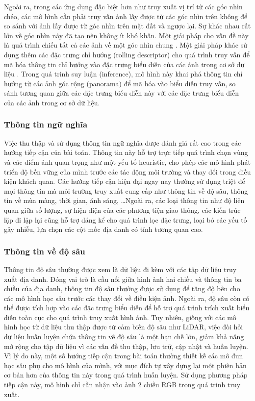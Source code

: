 Ngoài ra, trong các ứng dụng đặc biệt hơn như truy xuất vị trí từ các góc nhìn chéo, các mô hình cần phải truy vấn ảnh lấy được từ các góc nhìn trên không để so sánh với ảnh lấy được từ góc nhìn trên mặt đất và ngược lại. Sự khác nhau rất lớn về góc nhìn này đã tạo nên không ít khó khăn. Một giải pháp cho vấn đề này là quá trình chiếu tất cả các ảnh về một góc nhìn chung \cite{lin2015learning, castaldo2015semantic}. Một giải pháp khác sử dụng thêm các đặc trưng chỉ hướng (rolling descriptor) cho quá trình truy vấn để mã hóa thông tin chỉ hướng vào đặc trưng biểu diễn của các ảnh trong cơ sở dữ liệu \cite{xia2023convolutional}. Trong quá trình suy luận (inference), mô hình này khai phá thông tin chỉ hướng từ các ảnh góc rộng (panorama) để mã hóa vào biểu diễn truy vấn, so sánh tương quan giữa các đặc trưng biểu diễn này với các đặc trưng biểu diễn của các ảnh trong cơ sở dữ liệu.

\subsubsection{Thông tin ngữ nghĩa}

Việc thu thập và sử dụng thông tin ngữ nghĩa được đánh giá rất cao trong các hướng tiếp cận của bài toán. Thông tin này hỗ trợ trực tiếp quá trình chọn vùng và các điểm ảnh quan trọng như một yếu tố heuristic, cho phép các mô hình phát triển độ bền vững của mình trước các tác động môi trường và thay đổi trong điều kiện khách quan. Các hướng tiếp cận hiện đại ngay nay thường sử dụng triệt để mọi thông tin mà môi trường truy xuất cung cấp như thông tin về độ sâu, thông tin về mùa màng, thời gian, ánh sáng, \dots Ngoài ra, các loại thông tin như độ liên quan giữa số lượng, sự hiện diện của các phương tiện giao thông, các kiến trúc lặp đi lặp lại cũng hỗ trợ đáng kể cho quá trình lọc đặc trưng, loại bỏ các yếu tố gây nhiễu, lựa chọn các cột mốc địa danh có tính tương quan cao.

\subsubsection{Thông tin về độ sâu}

Thông tin độ sâu thường được xem là dữ liệu đi kèm với các tập dữ liệu truy xuất địa danh. Đóng vai trò là cầu nối giữa hình ảnh hai chiều và thông tin ba chiều của địa danh, thông tin độ sâu thường được sử dụng để tăng độ bền cho các mô hình học sâu trước các thay đổi về điều kiện ảnh. Ngoài ra, độ sâu còn có thể được tích hợp vào các đặc trưng biểu diễn để hỗ trợ quá trình trích xuất biểu diễn toàn cục cho quá trình truy xuất hình ảnh. Tuy nhiên, giống với các mô hình học từ dữ liệu thu thập được từ cảm biến độ sâu như LiDAR, việc đòi hỏi dữ liệu huấn luyện chứa thông tin về độ sâu là một hạn chế lớn, giảm khả năng mở rộng cho tập dữ liệu vì các vấn đề thu thập, lưu trữ, cập nhật và huấn luyện. Vì lý do này, một số hướng tiếp cận trong bài toán thường thiết kế các mô đun học sâu phụ cho mô hình của mình, với mục đích tự xây dựng lại một phiên bản cơ bản hơn của thông tin này trong quá trình huấn luyện. Sử dụng phương pháp tiếp cận này, mô hình chỉ cần nhận vào ảnh 2 chiều RGB trong quá trình truy xuất\cite{piasco2019learning}.

